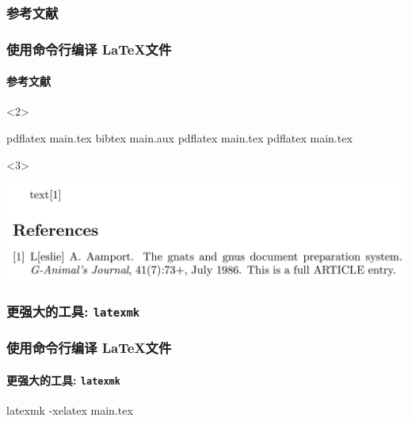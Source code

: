 \subsubsection{参考文献}

\begin{frame}[fragile, t]
  \frametitle{使用命令行编译 \LaTeX 文件}
  \framesubtitle{参考文献}


\begin{onlyenv}<2>
\begin{cmdcode}
pdflatex main.tex
bibtex main.aux
pdflatex main.tex
pdflatex main.tex
\end{cmdcode}  
\end{onlyenv}

\begin{onlyenv}<3>
  \begin{center}
    \includegraphics[width=\textwidth]{bib-ref.png}
  \end{center}
\end{onlyenv}
\end{frame}

\subsubsection{更强大的工具: \texttt{latexmk}}

\begin{frame}[fragile]
  \frametitle{使用命令行编译 \LaTeX 文件}
  \framesubtitle{更强大的工具: \texttt{latexmk}}


\begin{cmdcode}
latexmk -xelatex main.tex
\end{cmdcode}


\end{frame}

